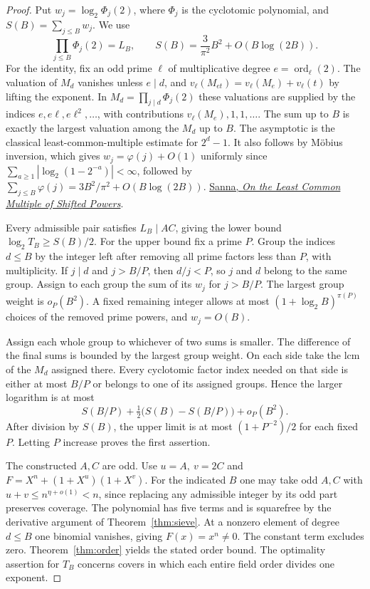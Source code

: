 \documentclass[11pt]{article}
\newcommand{\ord}{\operatorname{ord}}
\begin{document}
\begin{proof}
Put \(w_j=\log_2\Phi_j(2)\), where \(\Phi_j\) is the cyclotomic
polynomial, and \(S(B)=\sum_{j\le B}w_j\). We use
\[
       \prod_{j\le B}\Phi_j(2)=L_B,\qquad
       S(B)=\frac3{\pi^2}B^2+O(B\log(2B)).
\]
For the identity, fix an odd prime \(\ell\) of multiplicative degree
\(e=\ord_\ell(2)\). The valuation of \(M_d\) vanishes unless
\(e\mid d\), and \(v_\ell(M_{et})=v_\ell(M_e)+v_\ell(t)\) by
lifting the exponent. In \(M_d=\prod_{j\mid d}\Phi_j(2)\) these
valuations are supplied by the indices \(e,e\ell,e\ell^2,\ldots\),
with contributions \(v_\ell(M_e),1,1,\ldots\). The sum up to \(B\)
is exactly the largest valuation among the \(M_d\) up to \(B\).
The asymptotic is the classical least-common-multiple estimate for
\(2^d-1\). It also follows by M\"obius inversion, which gives
\(w_j=\varphi(j)+O(1)\) uniformly since
\(\sum_{a\ge1}|\log_2(1-2^{-a})|<\infty\), followed by
\(\sum_{j\le B}\varphi(j)=3B^2/\pi^2+O(B\log(2B))\).
\href{https://cs.uwaterloo.ca/journals/JIS/VOL24/Sanna/sanna7.pdf}
{Sanna, \emph{On the Least Common Multiple of Shifted Powers}}.

Every admissible pair satisfies \(L_B\mid AC\), giving the lower
bound \(\log_2 T_B\ge S(B)/2\). For the upper bound fix a prime \(P\).
Group the indices \(d\le B\) by the integer left after removing all
prime factors less than \(P\), with multiplicity. If \(j\mid d\)
and \(j>B/P\), then \(d/j<P\), so \(j\) and \(d\) belong to
the same group. Assign to each group the sum of its \(w_j\) for
\(j>B/P\). The largest group weight is \(o_P(B^2)\). A fixed
remaining integer allows at most \((1+\log_2 B)^{\pi(P)}\) choices of
the removed prime powers, and \(w_j=O(B)\).

Assign each whole group to whichever of two sums is smaller.
The difference of the final sums is bounded by the largest group
weight. On each side take the lcm of the \(M_d\) assigned there.
Every cyclotomic factor index needed on that side is either at most
\(B/P\) or belongs to one of its assigned groups. Hence the larger
logarithm is at most
\[
     S(B/P)+\tfrac12\bigl(S(B)-S(B/P)\bigr)+o_P(B^2).
\]
After division by \(S(B)\), the upper limit is at most
\((1+P^{-2})/2\) for each fixed \(P\). Letting \(P\) increase proves
the first assertion.

The constructed \(A,C\) are odd. Use \(u=A,\ v=2C\) and
\(F=X^n+(1+X^u)(1+X^v)\). For the indicated \(B\) one may take
odd \(A,C\) with \(u+v\le n^{\eta+o(1)}<n\), since replacing
any admissible integer by its odd part preserves coverage.
The polynomial has five terms and is squarefree by the derivative
argument of Theorem~\ref{thm:sieve}. At a nonzero element of degree
\(d\le B\) one binomial vanishes, giving \(F(x)=x^n\ne0\).
The constant term excludes zero. Theorem~\ref{thm:order} yields
the stated order bound. The optimality assertion for \(T_B\)
concerns covers in which each entire field order divides one exponent.
\end{proof}
\end{document}

